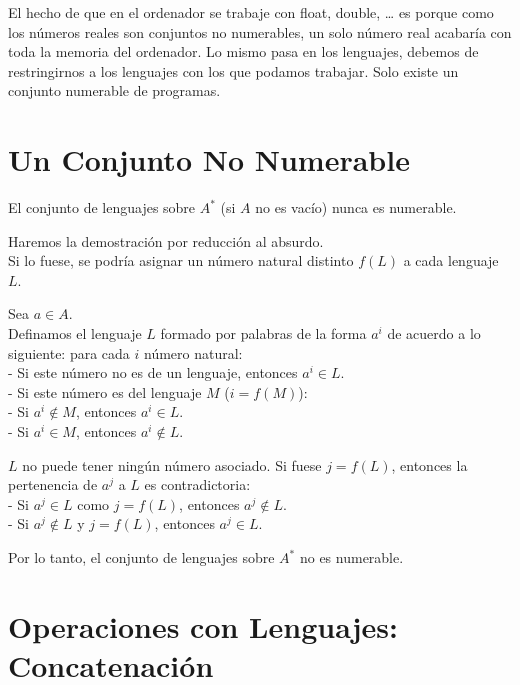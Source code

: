 \documentclass[12pt]{report} %
\begin{document}
El hecho de que en el ordenador se trabaje con float, double, \ldots{}
es porque como los números reales son conjuntos no numerables, un solo
número real acabaría con toda la memoria del ordenador. Lo mismo pasa en
los lenguajes, debemos de restringirnos a los lenguajes con los que
podamos trabajar. Solo existe un conjunto numerable de programas.

\hypertarget{un-conjunto-no-numerable}{%
\section{Un Conjunto No Numerable}\label{un-conjunto-no-numerable}}

\begin{ejemplo}
El conjunto de lenguajes sobre $A^*$ (si $A$ no es vacío) nunca es numerable.  
\end{ejemplo}

Haremos la demostración por reducción al absurdo.\\
Si lo fuese, se podría asignar un número natural distinto \(f(L)\) a
cada lenguaje \(L\).

Sea \(a \in A\).\\
Definamos el lenguaje \(L\) formado por palabras de la forma \(a^i\) de
acuerdo a lo siguiente: para cada \(i\) número natural:\\
- Si este número no es de un lenguaje, entonces \(a^i \in L\).\\
- Si este número es del lenguaje \(M\) (\(i = f(M)\)):\\
- Si \(a^i \notin M\), entonces \(a^i \in L\).\\
- Si \(a^i \in M\), entonces \(a^i \notin L\).

\(L\) no puede tener ningún número asociado. Si fuese \(j = f(L)\),
entonces la pertenencia de \(a^j\) a \(L\) es contradictoria:\\
- Si \(a^j \in L\) como \(j = f(L)\), entonces \(a^j \notin L\).\\
- Si \(a^j \notin L\) y \(j = f(L)\), entonces \(a^j \in L\).

Por lo tanto, el conjunto de lenguajes sobre \(A^*\) no es numerable.

\hypertarget{operaciones-con-lenguajes-concatenaciuxf3n}{%
\section{Operaciones con Lenguajes:
Concatenación}\label{operaciones-con-lenguajes-concatenaciuxf3n}}
\end{document}
